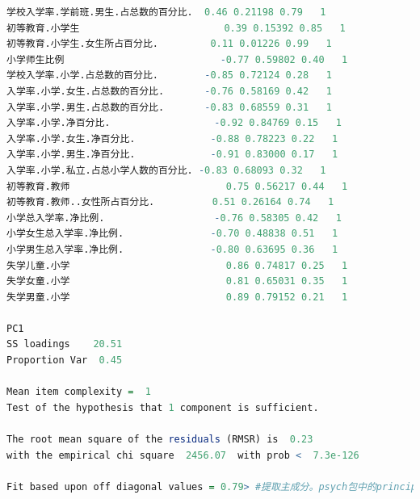 \documentclass{apmcmthesis}
\begin{document}
\begin{lstlisting}[language=r]
学校入学率.学前班.男生.占总数的百分比.  0.46 0.21198 0.79   1
初等教育.小学生                         0.39 0.15392 0.85   1
初等教育.小学生.女生所占百分比.         0.11 0.01226 0.99   1
小学师生比例                           -0.77 0.59802 0.40   1
学校入学率.小学.占总数的百分比.        -0.85 0.72124 0.28   1
入学率.小学.女生.占总数的百分比.       -0.76 0.58169 0.42   1
入学率.小学.男生.占总数的百分比.       -0.83 0.68559 0.31   1
入学率.小学.净百分比.                  -0.92 0.84769 0.15   1
入学率.小学.女生.净百分比.             -0.88 0.78223 0.22   1
入学率.小学.男生.净百分比.             -0.91 0.83000 0.17   1
入学率.小学.私立.占总小学人数的百分比. -0.83 0.68093 0.32   1
初等教育.教师                           0.75 0.56217 0.44   1
初等教育.教师..女性所占百分比.          0.51 0.26164 0.74   1
小学总入学率.净比例.                   -0.76 0.58305 0.42   1
小学女生总入学率.净比例.               -0.70 0.48838 0.51   1
小学男生总入学率.净比例.               -0.80 0.63695 0.36   1
失学儿童.小学                           0.86 0.74817 0.25   1
失学女童.小学                           0.81 0.65031 0.35   1
失学男童.小学                           0.89 0.79152 0.21   1

PC1
SS loadings    20.51
Proportion Var  0.45

Mean item complexity =  1
Test of the hypothesis that 1 component is sufficient.

The root mean square of the residuals (RMSR) is  0.23 
with the empirical chi square  2456.07  with prob <  7.3e-126 

Fit based upon off diagonal values = 0.79> #提取主成分。psych包中的principal( )函数可以根据原始数据或相关系数矩阵做主成分分析，其使用格式为：


\end{lstlisting}
\end{document}
